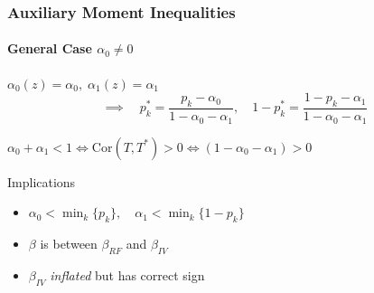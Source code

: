 \documentclass{beamer}
\begin{document}
\begin{frame}
  \frametitle{Auxiliary Moment Inequalities}
  \framesubtitle{General Case $\alpha_0 \neq 0$}


  \begin{block}{$\alpha_0(z) = \alpha_0, \; \alpha_1(z) =\alpha_1$ }
  \[
    \implies \quad p_k^* = \frac{p_k - \alpha_0}{1 - \alpha_0 - \alpha_1}, \quad
  1 - p_k^* = \frac{1 - p_k - \alpha_1}{1 - \alpha_0 - \alpha_1}\]
  \end{block}

  \begin{block}{$\alpha_0 + \alpha_1 < 1\iff \mbox{Cor}(T,T^*)>0 \iff (1 - \alpha_0 - \alpha_1) > 0$}
  \end{block}

  \vspace{-1em}

  \begin{alertblock}{Implications}
    \vspace{-1em}
    \begin{itemize}
      \item $\alpha_0 < \min_k \{p_k\}, \quad \alpha_1 < \min_k \{1 - p_k\}$
      \item $\beta$ is between $\beta_{RF}$ and $\beta_{IV}$ 
      \item $\beta_{IV}$ \emph{inflated} but has correct sign 
    \end{itemize}
  \end{alertblock}
  
\end{frame}
\end{document}
